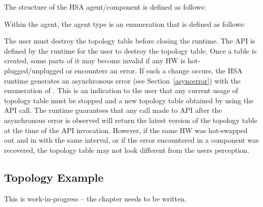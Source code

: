 The structure of the HSA agent/component is defined as follows:


Within the agent, the agent type is an enumeration that is defined
as follows:


The user must destroy the topology table before closing the runtime.
The  API is defined by the
runtime for the user to destroy the topology table. Once a table is
created, some parts of it may become invalid if any HW is
hot-plugged/unplugged or encounters an error. If such a change
occurs, the HSA runtime generates an asynchronous error (see
Section~\ref{asyncerror}) with the  enumeration
of . This is an indication to the
user that any current usage of topology table must be stopped and a
new topology table obtained by using the
 API call. The runtime guarantees
that any call made to  API after
the asynchronous error is observed will return the latest version of
the topology table at the time of the API invocation. However, if
the same HW was hot-swapped out and in with the same interval, or if
the error encountered in a component was recovered, the topology
table may not look different from the users perception. 

\hypertarget{topology_example}{} \subsection{Topology Example}
This is {\color{red} work-in-progress} -- the chapter needs to be written.
